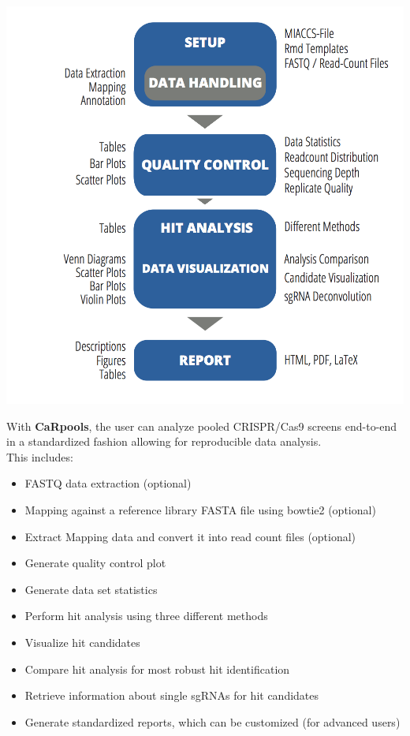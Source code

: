 \documentclass[]{article}
\providecommand{\tightlist}{%
  \setlength{\itemsep}{0pt}\setlength{\parskip}{0pt}}
\begin{document}
\includegraphics{./pictures/workflow.png}

With \textbf{CaRpools}, the user can analyze pooled CRISPR/Cas9 screens
end-to-end in a standardized fashion allowing for reproducible data
analysis.\\
This includes:

\begin{itemize}
\tightlist
\item
  FASTQ data extraction (optional)
\item
  Mapping against a reference library FASTA file using bowtie2
  (optional)
\item
  Extract Mapping data and convert it into read count files (optional)
\item
  Generate quality control plot
\item
  Generate data set statistics
\item
  Perform hit analysis using three different methods
\item
  Visualize hit candidates
\item
  Compare hit analysis for most robust hit identification
\item
  Retrieve information about single sgRNAs for hit candidates
\item
  Generate standardized reports, which can be customized (for advanced
  users)
\end{itemize}
\end{document}

